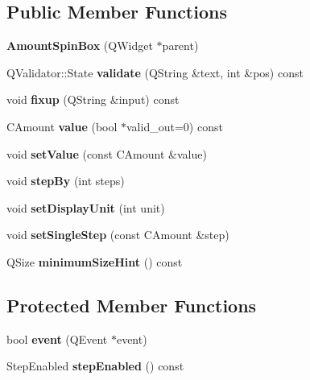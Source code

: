 \subsection*{Public Member Functions}
\begin{DoxyCompactItemize}
\item 
\mbox{\label{class_amount_spin_box_a1ce7eabf484c59b31f1032ce00d092c0}} 
{\bfseries Amount\+Spin\+Box} (Q\+Widget $\ast$parent)
\item 
\mbox{\label{class_amount_spin_box_afebc9df8aca245c93d460a48675586e1}} 
Q\+Validator\+::\+State {\bfseries validate} (Q\+String \&text, int \&pos) const
\item 
\mbox{\label{class_amount_spin_box_a082bac9de36ad4bb0c0f2d5d42f0acc6}} 
void {\bfseries fixup} (Q\+String \&input) const
\item 
\mbox{\label{class_amount_spin_box_ab7e522a441231ceaeeb0682ec62a06a9}} 
C\+Amount {\bfseries value} (bool $\ast$valid\+\_\+out=0) const
\item 
\mbox{\label{class_amount_spin_box_aca3825a8e5735dd99d3fa9665afb614c}} 
void {\bfseries set\+Value} (const C\+Amount \&value)
\item 
\mbox{\label{class_amount_spin_box_a055616d98771e6fcef3ee225d7b09ee9}} 
void {\bfseries step\+By} (int steps)
\item 
\mbox{\label{class_amount_spin_box_aef946e84b685f35c02782b50f4cce842}} 
void {\bfseries set\+Display\+Unit} (int unit)
\item 
\mbox{\label{class_amount_spin_box_a13c92cf7def6a03bf21c0279d5aaf857}} 
void {\bfseries set\+Single\+Step} (const C\+Amount \&step)
\item 
\mbox{\label{class_amount_spin_box_a40ee094061b19892825e7b30d3825ded}} 
Q\+Size {\bfseries minimum\+Size\+Hint} () const
\end{DoxyCompactItemize}
\subsection*{Protected Member Functions}
\begin{DoxyCompactItemize}
\item 
\mbox{\label{class_amount_spin_box_af6b14fef4e19f107983cc68f269306c8}} 
bool {\bfseries event} (Q\+Event $\ast$event)
\item 
\mbox{\label{class_amount_spin_box_aab6a98db725aa53d43f7863c831d6d7f}} 
Step\+Enabled {\bfseries step\+Enabled} () const
\end{DoxyCompactItemize}


